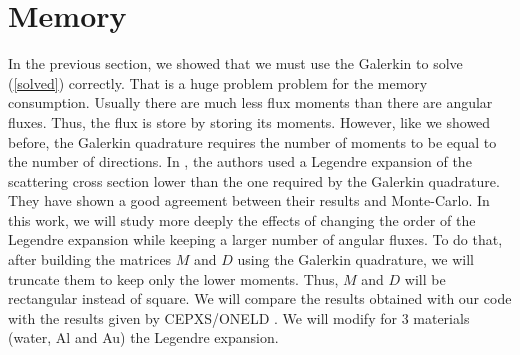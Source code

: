 \section{Memory}
In the previous section, we showed that we must use the Galerkin to solve
(\ref{solved}) correctly. That is a huge problem problem for the memory
consumption. Usually there are much less flux moments than there are angular
fluxes. Thus, the flux is store by storing its moments. However, like we
showed before, the Galerkin quadrature requires the number of moments to be
equal to the number of directions. In \cite{mem}, the authors used a Legendre
expansion of the scattering cross section lower than the one required by the
Galerkin quadrature. They have shown a good agreement between their results and
Monte-Carlo. In this work, we will study more deeply the effects of changing
the order of the Legendre expansion while keeping a larger number of angular
fluxes. To do that, after building the matrices $M$ and $D$ using the Galerkin 
quadrature, we will truncate them to keep only the lower moments. Thus, $M$
and $D$ will be rectangular instead of square. We will compare the results obtained 
with our code with the results given by CEPXS/ONELD \cite{cepxs}. We will modify for 
3 materials (water, Al and Au) the Legendre expansion.
